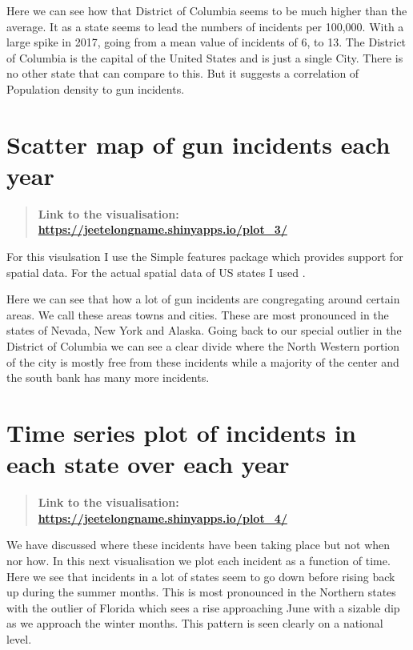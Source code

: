 \documentclass{report}
\begin{document}
Here we can see how that District of Columbia seems to be much higher than the
average. It as a state seems to lead the numbers of incidents per 100,000. With
a large spike in 2017, going from a mean value of incidents of 6, to 13. The
District of Columbia is the capital of the United States and is just a single
City. There is no other state that can compare to this. But it suggests a
correlation of Population density to gun incidents.

\chapter{Scatter map of gun incidents each year}\label{chapt:plot3}
\begin{quote}
	\textbf{Link to the visualisation:
		\url{https://jeetelongname.shinyapps.io/plot_3/}}
\end{quote}
For this visulsation I use the Simple features package
\autocite{pebesmaSimpleFeaturesStandardized2018} which provides support for
spatial data. For the actual spatial data of US states I used
\autocite{CRANPackageUSA}.

Here we can see that how a lot of gun incidents are congregating around certain
areas. We call these areas towns and cities. These are most pronounced in the
states of Nevada, New York and Alaska. Going back to our special outlier in the
District of Columbia we can see a clear divide where the North Western portion
of the city is mostly free from these incidents while a majority of the center
and the south bank has many more incidents.

\chapter{Time series plot of incidents in each state over each year }\label{chapt:plot4}
\begin{quote}
	\textbf{Link to the visualisation:
		\url{https://jeetelongname.shinyapps.io/plot_4/}}
\end{quote}

We have discussed where these incidents have been taking place but not when nor
how. In this next visualisation we plot each incident as a function of time.
Here we see that incidents in a lot of states seem to go down before rising back
up during the summer months. This is most pronounced in the Northern states with
the outlier of Florida which sees a rise approaching June with a sizable dip as
we approach the winter months. This pattern is seen clearly on a national
level.
\end{document}
